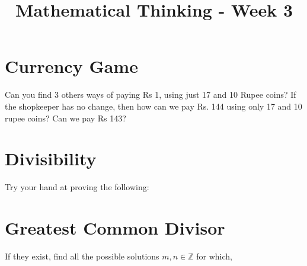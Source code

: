 \documentclass[12pt]{exam}
\title{Mathematical Thinking - Week 3}
\begin{document}
\maketitle
\tableofcontents
\section{Currency Game}
\begin{questions}
\question Can you find 3 others ways of paying Rs 1, using just 17 and 10 Rupee coins?
\question If the shopkeeper has no change, then how can we pay Rs. 144 using only 17 and 10 rupee coins? Can we pay Rs 143?
\end{questions}

\section{Divisibility}
\begin{questions}
\question Try your hand at proving the following:
\end{questions}

\section{Greatest Common Divisor}
\begin{questions}
\question If they exist, find all the possible solutions $m, n \in \mathbb{Z}$ for which,
\end{questions}
\end{document}
